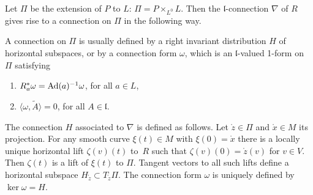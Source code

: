 \documentclass[10pt,a4paper]{amsart}
\newcommand{\lf}{\mathfrak l}
\numberwithin{equation}{section}
\begin{document}
	Let $\Pi$ be the extension of $P$ to $L$: $\Pi = P\times_{L^0} L$. Then the $\lf$-connection $\nabla$ of $R$ gives rise to a connection on $\Pi$ in the following way.
	
A connection on $\Pi$ is usually defined by a right invariant distribution $H$ of horizontal subspaces, or by a connection form $\omega$, which is an $\lf$-valued 1-form on $\Pi$ satisfying
	\begin{enumerate}\itemsep=0pt
		\item[$(i)$] $R_a^*\omega ={\rm Ad}(a)^{-1}\omega$, for all $a\in L$,
		\item[$(ii)$] $\langle \omega, \tilde{A}\rangle=0$, for all $A\in \lf$.
	\end{enumerate}


	
	The connection $H$ associated to $\nabla$ is defined as follows. Let $\mathring{z}\in \Pi$ and $\mathring{x}\in M$ its projection. For any smooth curve $\xi(t)\in M$ with $\xi(0)=\mathring{x}$ there is a locally unique horizontal lift $\zeta(v)(t)$ to~$R$ such that $\zeta(v)(0)=\mathring{z}(v)$ for $v\in V$. Then $\zeta(t)$ is a lift of $\xi(t)$ to $\Pi$. Tangent vectors to all such lifts define a horizontal subspace $H_{\mathring{z}}\subset T_{\mathring{z}}\Pi$. The connection form $\omega$ is uniquely defined by~$\ker \omega=H$.
	
\end{document}

